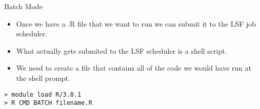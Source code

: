 \begin{frame}{Batch Mode}
\begin{itemize}
\item Once we have a .R file that we want to run we can submit it to the LSF job scheduler.  
\item What actually gets submited to the LSF scheduler is a shell script.  
\item We need to create a file that contains all of the code we would have run at the shell prompt.  
\end{itemize}
{\tt > module load R/3.0.1 }\\
{\tt > R CMD BATCH filename.R}\\
\end{frame}




